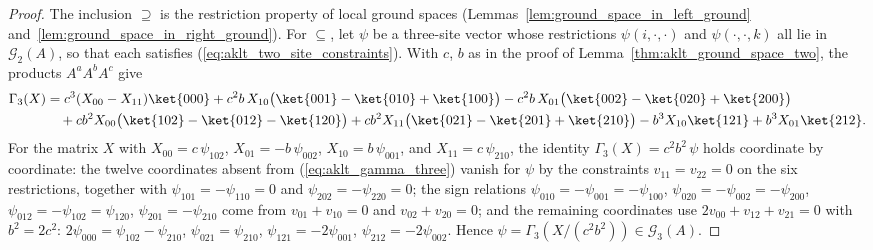 \begin{proof}
    \leanok
    The inclusion $\supseteq$ is the restriction property of local ground
    spaces (Lemmas~\ref{lem:ground_space_in_left_ground}
    and~\ref{lem:ground_space_in_right_ground}). For $\subseteq$, let $\psi$
    be a three-site vector whose restrictions $\psi(i,\cdot,\cdot)$ and
    $\psi(\cdot,\cdot,k)$ all lie in $\mathcal G_2(A)$, so that each satisfies
    (\ref{eq:aklt_two_site_constraints}). With $c$, $b$ as in the proof of
    Lemma~\ref{thm:aklt_ground_space_two}, the products $A^aA^bA^c$ give
    \begin{align}
        \Gamma_3(X)
         & = c^3(X_{00}-X_{11})\ket{000}
        + c^2b\,X_{10}\bigl(\ket{001}-\ket{010}+\ket{100}\bigr)
        - c^2b\,X_{01}\bigl(\ket{002}-\ket{020}+\ket{200}\bigr)
        \notag                           \\
         & \quad
        + cb^2X_{00}\bigl(\ket{102}-\ket{012}-\ket{120}\bigr)
        + cb^2X_{11}\bigl(\ket{021}-\ket{201}+\ket{210}\bigr)
        - b^3X_{10}\ket{121}
        + b^3X_{01}\ket{212}.
        \label{eq:aklt_gamma_three}
    \end{align}
    For the matrix $X$ with $X_{00} = c\,\psi_{102}$,
    $X_{01} = -b\,\psi_{002}$, $X_{10} = b\,\psi_{001}$, and
    $X_{11} = c\,\psi_{210}$, the identity $\Gamma_3(X) = c^2b^2\,\psi$ holds
    coordinate by coordinate: the twelve
    coordinates absent from (\ref{eq:aklt_gamma_three}) vanish for $\psi$ by
    the constraints $v_{11} = v_{22} = 0$ on the six restrictions, together
    with $\psi_{101} = -\psi_{110} = 0$ and $\psi_{202} = -\psi_{220} = 0$;
    the sign relations $\psi_{010} = -\psi_{001} = -\psi_{100}$,
    $\psi_{020} = -\psi_{002} = -\psi_{200}$, $\psi_{012} = -\psi_{102} = \psi_{120}$,
    $\psi_{201} = -\psi_{210}$ come from $v_{01}+v_{10} = 0$ and
    $v_{02}+v_{20} = 0$; and the remaining coordinates use
    $2v_{00}+v_{12}+v_{21} = 0$ with $b^2 = 2c^2$:
    $2\psi_{000} = \psi_{102}-\psi_{210}$, $\psi_{021} = \psi_{210}$,
    $\psi_{121} = -2\psi_{001}$, $\psi_{212} = -2\psi_{002}$. Hence
    $\psi = \Gamma_3(X/(c^2b^2)) \in \mathcal G_3(A)$.
\end{proof}

